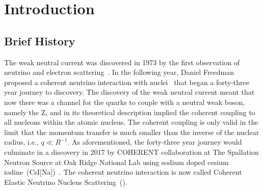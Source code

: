 \chapter{Introduction}
\label{chap:intro}

\section{Brief History} 
\label{sec:history}

The weak neutral current was discovered in 1973 by the first observation of neutrino and electron scattering~\cite{hasert:1973:search}. In the following year, Daniel Freedman proposed a coherent neutrino interaction with nuclei~\cite{freedman:1974:coherent} that began a forty-three year journey to discovery. The discovery of the weak neutral current meant that now there was a channel for the quarks to couple with a neutral weak boson, namely the Z, and in its theoretical description implied the coherent coupling to all nucleons within the atomic nucleus. The coherent coupling is only valid in the limit that the momentum transfer is much smaller than the inverse of the nuclear radius, i.e., $q \ll R^{-1}$. As aforementioned, the forty-three year journey would culminate in a discovery in 2017 by COHERENT collaboration at The Spallation Neutron Source at Oak Ridge National Lab using sodium doped cesium iodine~(CsI[Na])~\cite{COHERENT:2017:observation}. The coherent neutrino interaction is now called Coherent Elastic Neutrino Nucleus Scattering~(\cevns).

